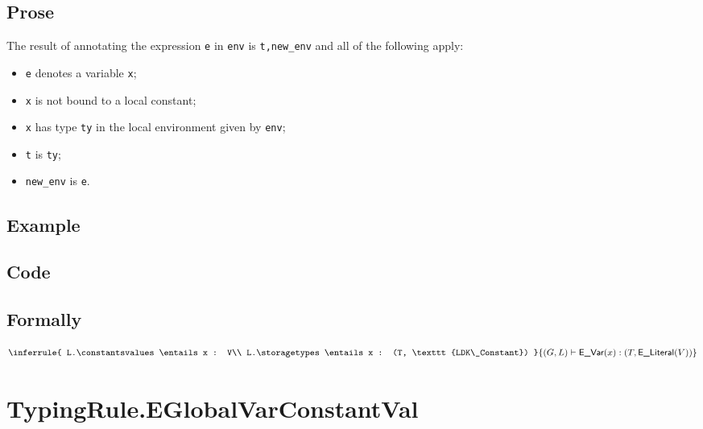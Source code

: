 \documentclass{book}
\newcommand\eliteral[1]{\textsf{E\_Literal}(#1)}
\begin{document}
  \subsection{Prose}
  The result of annotating the expression \texttt{e} in \texttt{env} is
\texttt{t,new\_env} and all of the following apply: 
  \begin{itemize}
  \item \texttt{e} denotes a variable \texttt{x};
  \item \texttt{x} is not bound to a local constant; 
  \item \texttt{x} has type \texttt{ty} in the local environment given by \texttt{env};
  \item \texttt{t} is \texttt{ty};
  \item \texttt{new\_env} is \texttt{e}.
  \end{itemize}

  \subsection{Example}

  \subsection{Code}

\begin{emptyformal}
  \subsection{Formally}
\[
\inferrule{
  L.\constantsvalues \entails x : V\\
  L.\storagetypes \entails x : (T, \texttt{LDK\_Constant})
  }
{(G,L) \entails \evar(x) : (T, \eliteral{V})}
\]
\end{emptyformal}


\section{TypingRule.EGlobalVarConstantVal \label{sec:TypingRule.EGlobalVarConstant}}
\end{document}
